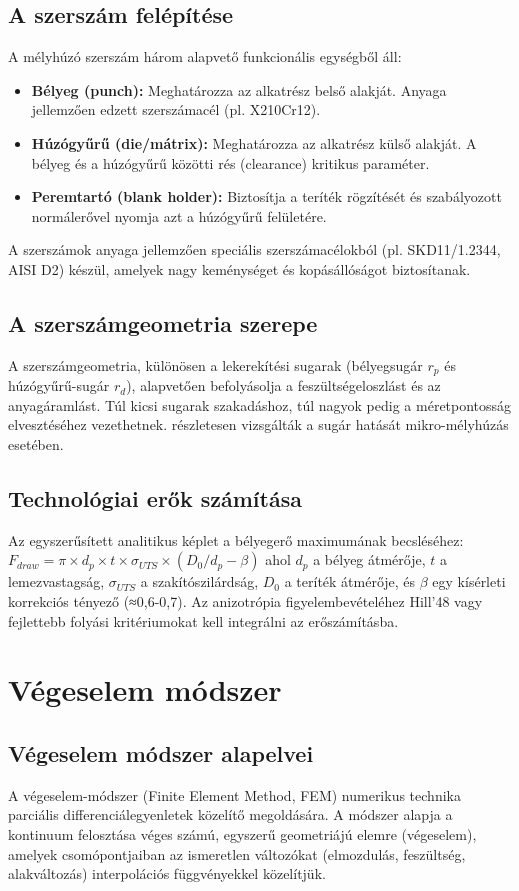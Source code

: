 \documentclass[12pt,a4paper,oneside]{report}
\begin{document}
\subsection{A szerszám felépítése}
A mélyhúzó szerszám három alapvető funkcionális egységből áll:
\begin{itemize}
    \item \textbf{Bélyeg (punch):} Meghatározza az alkatrész belső alakját. Anyaga jellemzően edzett szerszámacél (pl. X210Cr12).
    \item \textbf{Húzógyűrű (die/mátrix):} Meghatározza az alkatrész külső alakját. A bélyeg és a húzógyűrű közötti rés (clearance) kritikus paraméter.
    \item \textbf{Peremtartó (blank holder):} Biztosítja a teríték rögzítését és szabályozott normálerővel nyomja azt a húzógyűrű felületére.
\end{itemize}
A szerszámok anyaga jellemzően speciális szerszámacélokból (pl. SKD11/1.2344, AISI D2) készül, amelyek nagy keménységet és kopásállóságot biztosítanak.

\subsection{A szerszámgeometria szerepe}
A szerszámgeometria, különösen a lekerekítési sugarak (bélyegsugár $r_p$ és húzógyűrű-sugár $r_d$), alapvetően befolyásolja a feszültségeloszlást és az anyagáramlást. Túl kicsi sugarak szakadáshoz, túl nagyok pedig a méretpontosság elvesztéséhez vezethetnek. \cite{Luo2021} részletesen vizsgálták a sugár hatását mikro-mélyhúzás esetében.

\subsection{Technológiai erők számítása}
Az egyszerűsített analitikus képlet a bélyegerő maximumának becsléséhez:
$F_{draw} = \pi \times d_p \times t \times \sigma_{UTS} \times (D_0/d_p - \beta)$
ahol $d_p$ a bélyeg átmérője, $t$ a lemezvastagság, $\sigma_{UTS}$ a szakítószilárdság, $D_0$ a teríték átmérője, és $\beta$ egy kísérleti korrekciós tényező (≈0,6-0,7). Az anizotrópia figyelembevételéhez Hill'48 vagy fejlettebb folyási kritériumokat kell integrálni az erőszámításba.

\section{Végeselem módszer}
\subsection{Végeselem módszer alapelvei}
A végeselem-módszer (Finite Element Method, FEM) numerikus technika parciális differenciálegyenletek közelítő megoldására. A módszer alapja a kontinuum felosztása véges számú, egyszerű geometriájú elemre (végeselem), amelyek csomópontjaiban az ismeretlen változókat (elmozdulás, feszültség, alakváltozás) interpolációs függvényekkel közelítjük.
\end{document}
